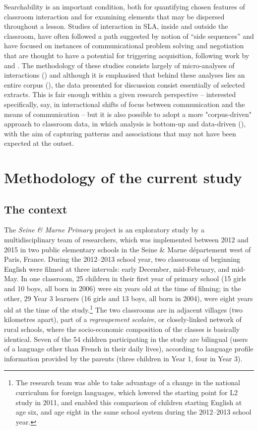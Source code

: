 \documentclass[output=paper,colorlinks,citecolor=brown,modfonts,nonflat]{../langscibook}
\begin{document}
Searchability is an important condition, both for quantifying chosen features of classroom interaction and for examining elements that may be dispersed throughout a lesson. Studies of interaction in SLA, inside and outside the classroom, have often followed a path suggested by  notion of “side sequences” and have focused on instances of communicational problem solving and negotiation that are thought to have a potential for triggering acquisition, following work by \citet{PietroEtAl1989,Vasseur1989} and \citet{Bange1992}. The methodology of these studies consists largely of micro-analyses of interactions (\citealt[7]{Pekarek-Doehler2000}) and although it is emphasised that behind these analyses lies an entire corpus (\citealt[3]{ArdittyVasseur2005}), the data presented for discussion consist essentially of selected extracts. This is fair enough within a given research perspective – interested specifically, say, in interactional shifts of focus between communication and the means of communication – but it is also possible to adopt a more "corpus-driven" approach to classroom data, in which analysis is bottom-up and data-driven (\citealt{Tognini-Bonelli2001,Seedhouse2005}), with the aim of capturing patterns and associations that may not have been expected at the outset.

\section{Methodology of the current study}\label{sec:hilton:3}
\subsection{{The context}\label{sec:hilton:3.1}}

The \textit{Seine \& Marne Primary} project is an exploratory study by a multidisciplinary team of researchers, which was implemented between 2012 and 2015 in two public elementary schools in the Seine \& Marne département west of Paris, France. During the 2012--2013 school year, two classrooms of beginning English were filmed at three intervals: early December, mid-February, and mid-May. In one classroom, 25 children in their first year of primary school (15 girls and 10 boys, all born in 2006) were six years old at the time of filming; in the other, 29 Year 3 learners (16 girls and 13 boys, all born in 2004), were eight years old at the time of the study.\footnote{The research team was able to take advantage of a change in the national curriculum for foreign languages, which lowered the starting point for L2 study in 2011, and enabled this comparison of children starting English at age six, and age eight in the same school system during the 2012--2013 school year.} The two classrooms are in adjacent villages (two kilometres apart), part of a \textit{regroupement} \textit{scolaire}, or closely-linked network of rural schools, where the socio-economic composition of the classes is basically identical. Seven of the 54 children participating in the study are bilingual (users of a language other than French in their daily lives), according to language profile information provided by the parents (three children in Year 1, four in Year 3).
\end{document}
